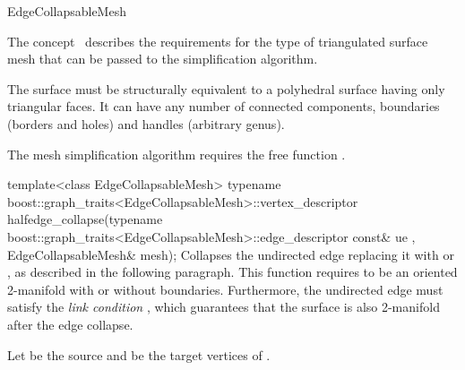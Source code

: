 
\begin{ccRefConcept}{EdgeCollapsableMesh}


\ccDefinition

The concept \ccRefName\ describes the requirements for the type of 
triangulated surface mesh that can be passed to the
simplification algorithm.

The surface must be structurally equivalent to a polyhedral surface
having only triangular faces. 
It can have any number of connected components, boundaries 
(borders and holes) and handles (arbitrary genus).

\ccRefines
{}


The mesh simplification algorithm requires the free function .

  \ccTagFullDeclarations
  \ccFunction
  {template<class EdgeCollapsableMesh>
  typename boost::graph_traits<EdgeCollapsableMesh>::vertex_descriptor
  halfedge_collapse(typename boost::graph_traits<EdgeCollapsableMesh>::edge_descriptor const& ue
                   , EdgeCollapsableMesh& mesh);
  }  
  {Collapses the undirected edge  replacing it with  or ,
  as described in the following paragraph.
  \ccPrecond This function requires  to be an oriented 2-manifold with or without boundaries. Furthermore, the undirected edge  must satisfy the {\em link 
  condition} \cite{degn-tpec-98}, which guarantees that the surface is also 2-manifold after the edge collapse. }

\smallskip
Let  be the source and  be the target vertices of .


\end{ccRefConcept}
